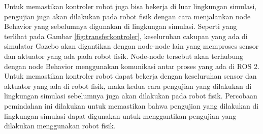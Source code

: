 Untuk memastikan kontroler robot juga bisa bekerja di luar lingkungan simulasi, pengujian juga akan dilakukan pada robot fisik dengan cara menjalankan node Behavior yang sebelumnya digunakan di lingkungan simulasi.
Seperti yang terlihat pada Gambar \ref{fig:transferkontroler}, keseluruhan cakupan yang ada di simulator Gazebo akan digantikan dengan node-node lain yang memproses sensor dan aktuator yang ada pada robot fisik.
Node-node tersebut akan terhubung dengan node Behavior menggunakan komunikasi antar proses yang ada di ROS 2.
Untuk memastikan kontroler robot dapat bekerja dengan keseluruhan sensor dan aktuator yang ada di robot fisik, maka kedua cara pengujian yang dilakukan di lingkungan simulasi sebelumnya juga akan dilakukan pada robot fisik.
Percobaan pemindahan ini dilakukan untuk memastikan bahwa pengujian yang dilakukan di lingkungan simulasi dapat digunakan untuk menggantikan pengujian yang dilakukan menggunakan robot fisik.
